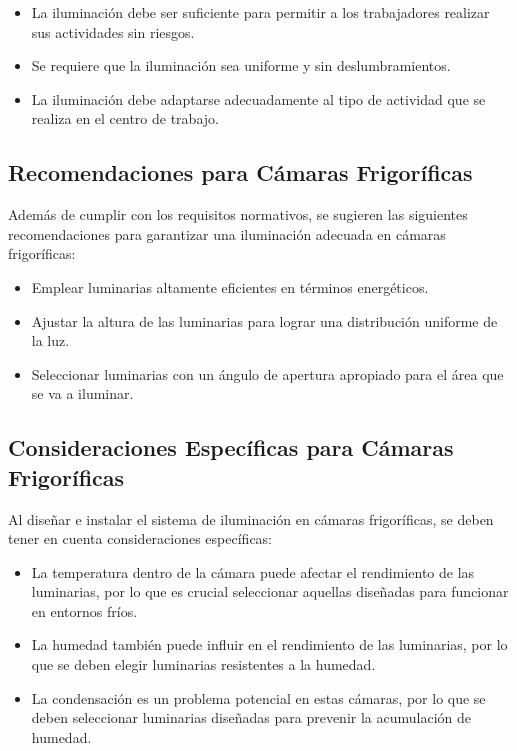 \begin{itemize}
	\item La iluminación debe ser suficiente para permitir a los trabajadores realizar sus actividades sin riesgos.
	\item Se requiere que la iluminación sea uniforme y sin deslumbramientos.
	\item La iluminación debe adaptarse adecuadamente al tipo de actividad que se realiza en el centro de trabajo.
\end{itemize}

\subsection{Recomendaciones para Cámaras Frigoríficas}

Además de cumplir con los requisitos normativos, se sugieren las siguientes recomendaciones para garantizar una iluminación adecuada en cámaras frigoríficas:

\begin{itemize}
	\item Emplear luminarias altamente eficientes en términos energéticos.
	\item Ajustar la altura de las luminarias para lograr una distribución uniforme de la luz.
	\item Seleccionar luminarias con un ángulo de apertura apropiado para el área que se va a iluminar.
\end{itemize}

\subsection{Consideraciones Específicas para Cámaras Frigoríficas}

Al diseñar e instalar el sistema de iluminación en cámaras frigoríficas, se deben tener en cuenta consideraciones específicas:

\begin{itemize}
	\item La temperatura dentro de la cámara puede afectar el rendimiento de las luminarias, por lo que es crucial seleccionar aquellas diseñadas para funcionar en entornos fríos.
	\item La humedad también puede influir en el rendimiento de las luminarias, por lo que se deben elegir luminarias resistentes a la humedad.
	\item La condensación es un problema potencial en estas cámaras, por lo que se deben seleccionar luminarias diseñadas para prevenir la acumulación de humedad.
\end{itemize}

